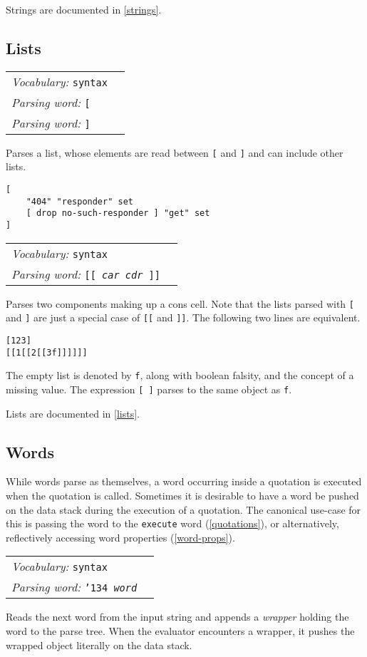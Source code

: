 \documentclass{book}
\newcommand{\bs}{\char'134}
\newcommand{\vocabulary}[1]{\emph{Vocabulary:} \texttt{#1}&\\}
\newcommand{\parsingword}[2]{\index{\texttt{#1}}\emph{Parsing word:} \texttt{#2}&\\}
\newcommand{\wordtable}[1]{


\begin{tabularx}{12cm}{lX}
\hline
#1
\hline
\end{tabularx}

}
\begin{document}
Strings are documented in \ref{strings}.

\subsection{Lists}\label{listsyntax}
\newcommand{\listglos}{
}
\listglos
\wordtable{
\vocabulary{syntax}
\parsingword{[}{[}
\parsingword{]}{]}
}
Parses a list, whose elements are read between \texttt{[} and \texttt{]} and can include other lists.
\begin{verbatim}
[
    "404" "responder" set
    [ drop no-such-responder ] "get" set
]
\end{verbatim}
\newcommand{\consglos}{}
\consglos
\wordtable{
\vocabulary{syntax}
\parsingword{[[}{[[ \emph{car} \emph{cdr} ]]}
}
Parses two components making up a cons cell. Note that the lists parsed with \texttt{[} and \texttt{]} are just a special case of \texttt{[[} and \texttt{]]}. The following two lines are equivalent.
\begin{alltt}
[ 1 2 3 ]
[[ 1 [[ 2 [[ 3 f ]] ]] ]]
\end{alltt}
The empty list is denoted by \texttt{f}, along with boolean falsity, and the concept of a missing value. The expression \texttt{[ ]} parses to the same object as \texttt{f}.

Lists are documented in \ref{lists}.

\subsection{Words}

\newcommand{\wrapglos}{
}
\wrapglos
While words parse as themselves, a word occurring inside a quotation is executed when the quotation is called. Sometimes it is desirable to have a word be pushed on the data stack during the execution of a quotation. The canonical use-case for this is passing the word to the \verb|execute| word (\ref{quotations}), or alternatively, reflectively accessing word properties (\ref{word-props}).
\wordtable{
\vocabulary{syntax}
\parsingword{\bs}{\bs~\emph{word}}
}
Reads the next word from the input string and appends a \emph{wrapper} holding the word to the parse tree. When the evaluator encounters a wrapper, it pushes the wrapped object literally on the data stack.
\end{document}
